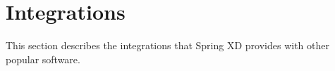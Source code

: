 \section{Integrations}
This section describes the integrations that Spring XD provides with other popular software.

